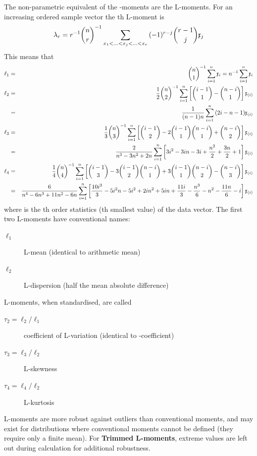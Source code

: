 \begin{refsection}
The non-parametric equivalent of the -moments are the L-moments. For an increasing ordered sample vector the th L-moment is
\begin{equation}
   \lambda_r = r^{-1} \binom{n}{r}^{-1} \sum_{x_1 < \ldots < x_j < \ldots < x_r}{(-1)^{r-j} \binom{r-1}{j} \mathfrak{x}_j}
\end{equation}
This means that
\begin{eqnarray}
  \ell_1 &=& \binom{n}{1}^{-1} \sum_{i=1}^n{\mathfrak{x}_i}  = n^{-1} \sum_{i=1}^n{\mathfrak{x}_i} \\
  \nonumber
  \ell_2 &=& \frac{1}{2} \binom{n}{2}^{-1} \sum_{i=1}^n{\left[\binom{i-1}{1} - \binom{n-i}{1}\right] \mathfrak{x}_{(i)}} \\
  \nonumber
         &=& \frac{1}{(n-1) n} \sum_{i=1}^n{(2i - n -1) \mathfrak{x}_{(i)}}\\
  \nonumber
  \ell_3 &=& \frac{1}{3} \binom{n}{3}^{-1} \sum_{i=1}^n{\left[\binom{i-1}{2} - 2 \binom{i-1}{1}\binom{n-i}{1} + \binom{n-i}{2}\right]\mathfrak{x}_{(i)}} \\
  \nonumber
         &=& \frac{2}{n^3 - 3n^2 + 2n} \sum_{i=1}^n{\left[3i^2 - 3in - 3i + \frac{n^2}{2} + \frac{3n}{2} + 1  \right]\mathfrak{x}_{(i)}}\\
  \nonumber
  \ell_4 &=& \frac{1}{4} \binom{n}{4}^{-1} \sum_{i=1}^n{\left[\binom{i-1}{3} - 3 \binom{i-1}{2}\binom{n-i}{1} + 3 \binom{i-1}{1}\binom{n-i}{2} - \binom{n-i}{3}\right]\mathfrak{x}_{(i)}} \\
  \nonumber
         &=& \frac{6}{n^4 - 6n^3 + 11n^2 - 6n} \sum_{i=1}^n{\left[\frac{10 i^3}{3} - 5 i^2 n - 5 i^2 + 2 i n^2 + 5 i n + \frac{11 i}{3} - \frac{n^3}{6} - n^2 - \frac{11 n}{6} - i\right]\mathfrak{x}_{(i)}}
\end{eqnarray}
where  is the th order statistics (th smallest value) of the data vector. The first two L-moments have conventional names:
\begin{description}
  \item[\(\ell_1\)]{L-mean (identical to arithmetic mean)}
  \item[\(\ell_2\)]{L-dispersion (half the mean absolute difference)}
\end{description}
L-moments, when standardised, are called
\begin{description}
  \item[\(\tau_2 = \ell_2/\ell_1\)]{coefficient of L-variation (identical to -coefficient)}
  \item[\(\tau_3 = \ell_3/\ell_2\)]{L-skewness}
  \item[\(\tau_4 = \ell_4/\ell_2\)]{L-kurtosis}
\end{description}
L-moments are more robust against outliers than conventional moments, and may exist for distributions where conventional moments cannot be defined (they require only a finite mean). For \textbf{Trimmed L-moments}, extreme values are left out during calculation for additional robustness.




\end{refsection}
